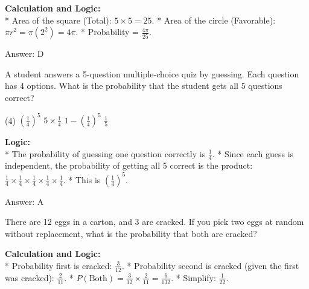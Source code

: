 \documentclass[11pt,paper=a4,answers]{exam}
\begin{document}
\begin{questions}
\begin{solution}


\vspace{30pt}

\textbf{Calculation and Logic:} \\
* Area of the square (Total): $5 \times 5 = 25$.
* Area of the circle (Favorable): $\pi r^2 = \pi (2^2) = 4\pi$.
* Probability = $\frac{4\pi}{25}$.

\vspace{30pt}

Answer: \colorbox{yellow!100}{D}
\end{solution}

\vspace{60pt}

\question
A student answers a 5-question multiple-choice quiz by guessing. Each question has 4 options. What is the probability that the student gets all 5 questions correct?
\begin{tasks}(4)
    \task $(\frac{1}{4})^5$
    \task $5 \times \frac{1}{4}$
    \task $1 - (\frac{1}{4})^5$
    \task $\frac{1}{5}$
\end{tasks}

\begin{solution}
\textbf{Logic:} \\
* The probability of guessing one question correctly is $\frac{1}{4}$.
* Since each guess is independent, the probability of getting all 5 correct is the product: $\frac{1}{4} \times \frac{1}{4} \times \frac{1}{4} \times \frac{1}{4} \times \frac{1}{4}$.
* This is $(\frac{1}{4})^5$.

\vspace{30pt}

Answer: \colorbox{yellow!100}{A}
\end{solution}

\vspace{60pt}

\question
There are 12 eggs in a carton, and 3 are cracked. If you pick two eggs at random without replacement, what is the probability that both are cracked?

\begin{solution}
\textbf{Calculation and Logic:} \\
* Probability first is cracked: $\frac{3}{12}$.
* Probability second is cracked (given the first was cracked): $\frac{2}{11}$.
* $P(\text{Both}) = \frac{3}{12} \times \frac{2}{11} = \frac{6}{132}$.
* Simplify: $\frac{1}{22}$.


\end{solution}
\end{questions}
\end{document}

